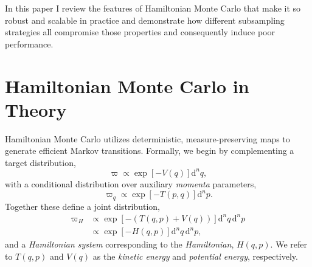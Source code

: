 \documentclass{article}
\begin{document}
In this paper I review the features of Hamiltonian Monte Carlo that make 
it so robust and scalable in practice and demonstrate how different subsampling 
strategies all compromise those properties and consequently induce poor 
performance. 

\section{Hamiltonian Monte Carlo in Theory}

Hamiltonian Monte Carlo utilizes deterministic, measure-preserving maps to 
generate efficient Markov transitions.  Formally, we begin by complementing 
a target distribution,
%
\begin{equation*}
\varpi \propto \exp \! \left[ - V ( q ) \right] \mathrm{d}^{n} q,
\end{equation*}
%
with a conditional distribution over auxiliary \textit{momenta} parameters,
%
\begin{equation*}
\varpi_{q} \propto \exp \! \left[ - T (p, q) \right] \mathrm{d}^{n} p.
\end{equation*}
%
Together these define a joint distribution,
%
\begin{align*}
\varpi_{H} 
&\propto \exp \! \left[ - \left( T (q, p) + V (q) \right) \right] \mathrm{d}^{n} q \, \mathrm{d}^{n} p
\\
&\propto \exp \! \left[ - H (q, p) \right] \mathrm{d}^{n} q \, \mathrm{d}^{n} p,
\end{align*}
%
and a \textit{Hamiltonian system} corresponding to the \textit{Hamiltonian},
$ H (q, p) $.  We refer to $T (q, p)$ and $V (q)$ as the \textit{kinetic energy} 
and \textit{potential energy}, respectively.
\end{document}

